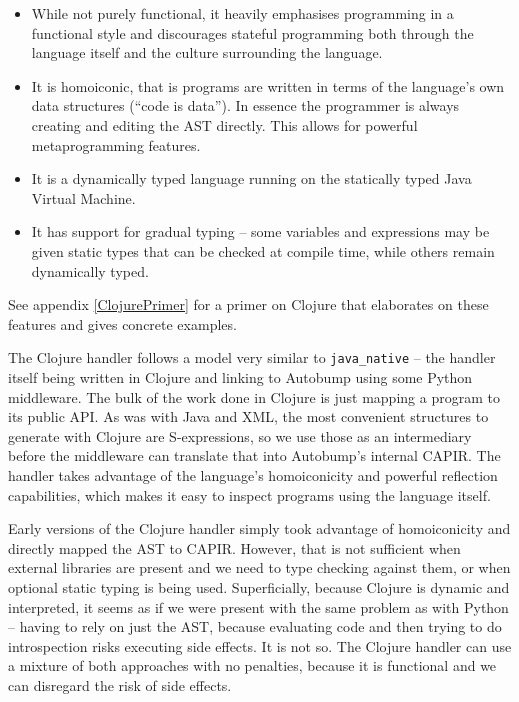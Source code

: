 \documentclass{l4proj}
\newcommand\genericstyle{\lstset{basicstyle=\ttm}}
\newcommand\codeinline[1]{{\genericstyle\lstinline!#1!}}
\begin{document}
\begin{itemize}
\item While not purely functional, it heavily emphasises programming
in a functional style and discourages stateful programming both through the
language itself and the culture surrounding the language.
\item It is homoiconic, that is programs are written in terms of the
language's own data structures (``code is data''). In essence the
programmer is always creating and editing the AST directly. This
allows for powerful metaprogramming features.
\item It is a dynamically typed language running on the statically
typed Java Virtual Machine.
\item It has support for gradual typing --
some variables and expressions may be given static types that can be
checked at compile time, while others remain dynamically typed.
\end{itemize}

See appendix \ref{ClojurePrimer} for a primer on Clojure that
elaborates on these features and gives concrete examples.

The Clojure handler follows a model very similar to \codeinline{java_native}
-- the handler itself being written in Clojure and linking to Autobump
using some Python middleware. The bulk of the work done in Clojure is
just mapping a program to its public API. As was with Java and XML,
the most convenient structures to generate with Clojure are
S-expressions, so we use those as an intermediary before the
middleware can translate that into Autobump's internal CAPIR. The
handler takes advantage of the language's homoiconicity and powerful
reflection capabilities, which makes it easy to inspect programs using
the language itself.

Early versions of the Clojure handler simply took advantage of
homoiconicity and directly mapped the AST to CAPIR. However, that is
not sufficient when external libraries are present and we need to type
checking against them, or when optional static typing is being used.
Superficially, because Clojure is dynamic and interpreted, it seems as
if we were present with the same problem as with Python -- having to
rely on just the AST, because evaluating code and then trying to do
introspection risks executing side effects. It is not so. The Clojure
handler can use a mixture of both approaches with no penalties,
because it is functional and we can disregard the risk of side effects.

\end{document}
